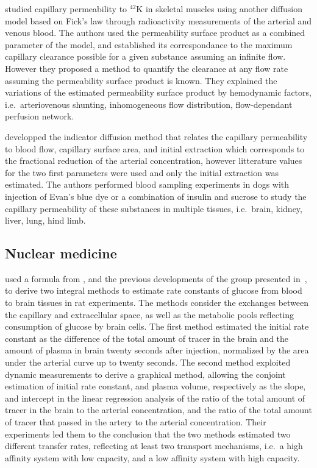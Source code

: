 \citet{Renkin:1959te} studied capillary permeability to $^{42}$K in skeletal muscles using another diffusion model based on Fick's law through radioactivity measurements of the arterial and venous blood.
The authors used the permeability surface product as a combined parameter of the model, and established its correspondance to the maximum capillary clearance possible for a given substance assuming an infinite flow.
However they proposed a method to quantify the clearance at any flow rate assuming the permeability surface product is known.
They explained the variations of the estimated permeability surface product by hemodynamic factors, i.e.~arteriovenous shunting, inhomogeneous flow distribution, flow-dependant perfusion network.

\citet{Crone:1963cz} developped the indicator diffusion method that relates the capillary permeability to blood flow, capillary surface area, and initial extraction which corresponds to the fractional reduction of the arterial concentration, however litterature values for the two first parameters were used and only the initial extraction was estimated.
The authors performed blood sampling experiments in dogs with injection of Evan's blue dye or a combination of insulin and sucrose to study the capillary permeability of these substances in multiple tissues, i.e.~brain, kidney, liver, lung, hind limb.

\subsection{Nuclear medicine}

\citet{Gjedde:1981ge} used a formula from \citet{Crone:1963cz}, and the previous developments of the group presented in~\cite{Gjedde:1980kh}, to derive two integral methods to estimate rate constants of glucose from blood to brain tissues in rat experiments.
The methods consider the exchanges between the capillary and extracellular space, as well as the metabolic pools reflecting consumption of glucose by brain cells.
The first method estimated the initial rate constant as the difference of the total amount of tracer in the brain and the amount of plasma in brain twenty seconds after injection, normalized by the area under the arterial curve up to twenty seconds.
The second method exploited dynamic measurements to derive a graphical method, allowing the conjoint estimation of initial rate constant, and plasma volume, respectively as the slope, and intercept in the linear regression analysis of the ratio of the total amount of tracer in the brain to the arterial concentration, and the ratio of the total amount of tracer that passed in the artery to the arterial concentration.
Their experiments led them to the conclusion that the two methods estimated two different transfer rates, reflecting at least two transport mechanisms, i.e.~a high affinity system with low capacity, and a low affinity system with high capacity.

